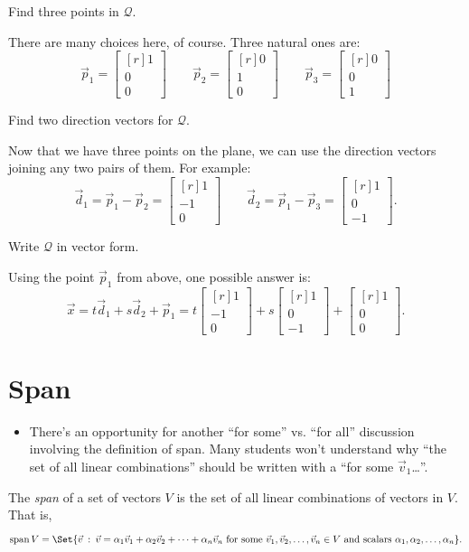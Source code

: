 \documentclass{problemset}
\DeclareMathOperator{\Span}{span}
\newcommand{\mat}[1]{\begin{bmatrix*}[r]#1\end{bmatrix*}}
\providecommand\given{}
\newcommand\SetSymbol[1][]{%
	\nonscript\::%
	\allowbreak
	\nonscript\:
	\mathopen{}}
\renewcommand\given{\SetSymbol[\delimsize]}
\begin{document}
	\begin{parts}
		\item Find three points in $\mathcal Q$.
			\begin{solution}
				There are many choices here, of course. Three natural ones are:
				\[
					\vec p_1 = \mat{1\\0\\0}
					\qquad
					\vec p_2 = \mat{0\\1\\0}
					\qquad
					\vec p_3 = \mat{0\\0\\1}
				\]
			\end{solution}
		\item Find two direction vectors for $\mathcal Q$.
			\begin{solution}
				Now that we have three points on the plane, we can use the
				direction vectors joining any two pairs of them. For example:
				\[
					\vec d_1 = \vec p_1 - \vec p_2 = \mat{1\\-1\\0}
					\qquad
					\vec d_2 = \vec p_1 - \vec p_3 = \mat{1\\0\\-1}.
				\]
			\end{solution}
		\item Write $\mathcal Q$ in vector form.
			\begin{solution}
				Using the point $\vec p_1$ from above, one possible answer is:
				\[
					\vec x = t\vec d_1 + s\vec d_2 + \vec p_1
					= t \mat{1\\-1\\0} + s \mat{1\\0\\-1} + \mat{1\\0\\0}.
				\]
			\end{solution}
	\end{parts}

\section*{Span}
	\begin{annotation}
		\begin{notes}
			\begin{itemize}
				\item There's an opportunity for another ``for some'' vs. ``for all''
					discussion involving the definition of span. Many students won't
					understand why ``the set of all linear combinations'' should
					be written with a ``for some $\vec v_1$\ldots''.
			\end{itemize}
		\end{notes}
	\end{annotation}
	\begin{definition}[Span]
		The \emph{span} of a set of vectors $V$ is the set of
		all linear combinations of vectors in $V$.  That is,
		\[
			\Span V = \Set{\vec v \given \vec v=\alpha_1\vec v_1+\alpha_2\vec v_2 + \cdots
			+\alpha_n\vec v_n\text{ for some }\vec v_1,\vec v_2,\ldots,\vec v_n\in V
			\text{ and scalars }\alpha_1,\alpha_2,\ldots,\alpha_n}.
		\]
	\end{definition}
\end{document}

